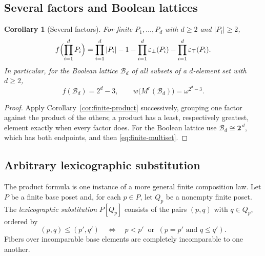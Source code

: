 \documentclass[11pt,letterpaper]{article}
\newtheorem{corollary}[theorem]{Corollary}
\theoremstyle{definition}
\theoremstyle{remark}
\newcommand{\epsbot}{\varepsilon_{\bot}}
\newcommand{\epstop}{\varepsilon_{\top}}
\newcommand{\chain}[1]{\mathbf{#1}}
\newcommand{\Bool}{\mathcal{B}}
\begin{document}
\subsection{Several factors and Boolean lattices}

\begin{corollary}[Several factors]\label{cor:boolean}
For finite $P_1,\ldots,P_d$ with $d\ge2$ and $|P_i|\ge2$,
\[
 f\Bigl(\prod_{i=1}^dP_i\Bigr)
 =\prod_{i=1}^d|P_i|-1-\prod_{i=1}^d\epsbot(P_i)-\prod_{i=1}^d\epstop(P_i).
\]
In particular, for the Boolean lattice $\Bool_d$ of all subsets of a
$d$-element set with $d\ge2$,
\[
 f(\Bool_d)=2^d-3,
 \qquad w\bigl(M^r(\Bool_d)\bigr)=\omega^{2^d-3}.
\]
\end{corollary}
\begin{proof}
Apply Corollary~\ref{cor:finite-product} successively, grouping one factor
against the product of the others; a product has a least, respectively
greatest, element exactly when every factor does. For the Boolean lattice
use $\Bool_d\cong\chain2^{\,d}$, which has both endpoints, and then
\eqref{eq:finite-multiset}.
\end{proof}

\subsection{Arbitrary lexicographic substitution}\label{sec:substitution}

The product formula is one instance of a more general finite composition
law. Let $P$ be a finite base poset and, for each $p\in P$, let $Q_p$ be a
nonempty finite poset. The \emph{lexicographic substitution} $P[Q_p]$
consists of the pairs $(p,q)$ with $q\in Q_p$, ordered by
\[
 (p,q)\le(p',q')
 \quad\Longleftrightarrow\quad
 p<p'\ \text{ or }\ (p=p'\text{ and }q\le q').
\]
Fibers over incomparable base elements are completely incomparable to one
another.
\end{document}
